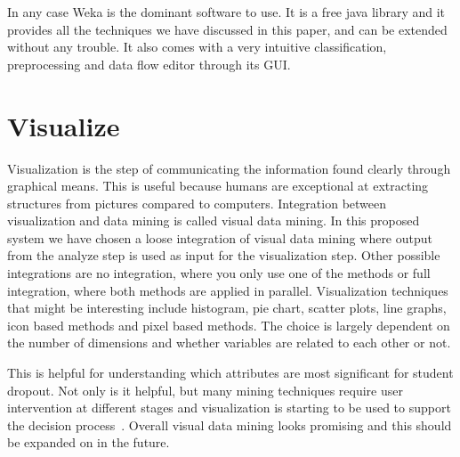 \bigskip\noindent
In any case Weka is the dominant software to use. 
It is a free java library and it provides all the techniques we have discussed in this paper, and can be extended without any trouble.
It also comes with a very intuitive classification, preprocessing and data flow editor through its GUI.

\section{Visualize}	
Visualization is the step of communicating the information found clearly through graphical means. 
This is useful because humans are exceptional at extracting structures from pictures compared to computers. 
Integration between visualization and data mining is called visual data mining.
In this proposed system we have chosen a loose integration of visual data mining where output from the analyze step is used as input for the visualization step.
Other possible integrations are no integration, where you only use one of the methods or full integration, where both methods are applied in parallel.
Visualization techniques that might be interesting include histogram, pie chart, scatter plots, line graphs, icon based methods and pixel based methods.
The choice is largely dependent on the number of dimensions and whether variables are related to each other or not.

\bigskip\noindent
This is helpful for understanding which attributes are most significant for student dropout. 
Not only is it helpful, but many mining techniques require user intervention at different stages and visualization is starting to be used to support the decision process~\cite{1207445}.
Overall visual data mining looks promising and this should be expanded on in the future.
